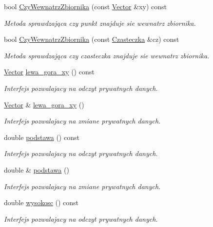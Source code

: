 \begin{DoxyCompactItemize}
bool \hyperlink{class_zbiornik_af11180e2f8fdca6269b1f825ad3bceff}{Czy\-Wewnatrz\-Zbiornika} (const \hyperlink{class_vector}{Vector} \&xy) const 
\begin{DoxyCompactList}\small\item\em Metoda sprawdzająca czy punkt znajduje sie wewnatrz zbiornika. \end{DoxyCompactList}\item 
bool \hyperlink{class_zbiornik_ae158efae449beb3d760bb18f5337ac72}{Czy\-Wewnatrz\-Zbiornika} (const \hyperlink{class_czasteczka}{Czasteczka} \&cz) const 
\begin{DoxyCompactList}\small\item\em Metoda sprawdzająca czy czasteczka znajduje sie wewnatrz zbiornika. \end{DoxyCompactList}\item 
\hyperlink{class_vector}{Vector} \hyperlink{class_zbiornik_a811829ed13289d4fad56ae5fcd92bec8}{lewa\-\_\-gora\-\_\-xy} () const 
\begin{DoxyCompactList}\small\item\em Interfejs pozwalajacy na odczyt prywatnych danych. \end{DoxyCompactList}\item 
\hyperlink{class_vector}{Vector} \& \hyperlink{class_zbiornik_aa3e1369b230b9e0dedd6a364a75dcbfc}{lewa\-\_\-gora\-\_\-xy} ()
\begin{DoxyCompactList}\small\item\em Interfejs pozwalajacy na zmiane prywatnych danych. \end{DoxyCompactList}\item 
double \hyperlink{class_zbiornik_ac64f411a313024c52dbc1c18897df573}{podstawa} () const 
\begin{DoxyCompactList}\small\item\em Interfejs pozwalajacy na odczyt prywatnych danych. \end{DoxyCompactList}\item 
double \& \hyperlink{class_zbiornik_a7749987df3c4966a1e45908ef8a72bf3}{podstawa} ()
\begin{DoxyCompactList}\small\item\em Interfejs pozwalajacy na zmiane prywatnych danych. \end{DoxyCompactList}\item 
double \hyperlink{class_zbiornik_a72ab0eb9f3562de0ea90e176f515be42}{wysokosc} () const 
\begin{DoxyCompactList}\small\item\em Interfejs pozwalajacy na odczyt prywatnych danych. \end{DoxyCompactList}\item 

\end{DoxyCompactItemize}
